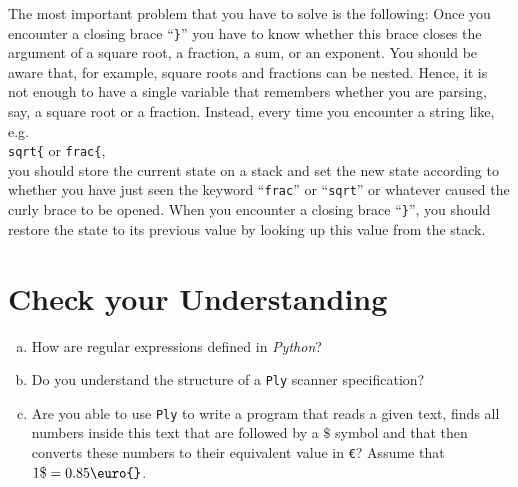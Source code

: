 \remarkEng
The most important problem that you have to solve is the following:  Once you encounter a closing brace
``\texttt{\}}'' you have to know whether this brace closes the argument of a square root, a
fraction, a sum, or an exponent.  You should be aware that, for example, square roots and fractions
can be nested.  Hence, it is not enough to have a single variable that remembers whether you are
parsing, say, a square root or a fraction.  Instead, every time you encounter a string like, e.g.
\\[0.2cm]
\hspace*{1.3cm}
\texttt{sqrt\{} \quad or \quad \texttt{frac\{},
\\[0.2cm]
you should store the current state on a stack and set the new state according to whether you have just seen the
keyword ``\texttt{frac}'' or ``\texttt{sqrt}'' or whatever caused the
curly brace to be opened.  When you encounter a closing brace ``\texttt{\}}'', you should 
restore the state to its previous value by looking up this value from the stack.  
\eox

\section{Check your Understanding}
\begin{enumerate}[(a)]
\item How are regular expressions defined in \textsl{Python}?
\item Do you understand the structure of a \texttt{Ply} scanner specification?
\item Are you able to use \texttt{Ply} to write a program that reads a given text, finds all numbers inside
      this text that are followed by a $\texttt{\$}$ symbol and that then converts these numbers to their equivalent
      value in \texttt{\euro{}}?  Assume that $1 \mathtt{\$} = 0.85 \texttt{\euro{}}$.
\end{enumerate}



